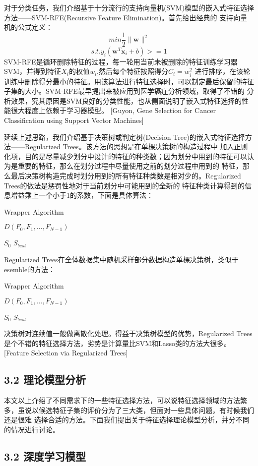 \documentclass[a4paper,UTF8]{article}
\begin{document}
对于分类任务，我们介绍基于十分流行的支持向量机(SVM)模型的嵌入式特征选择方法——SVM-RFE(Recursive Feature Elimination)。首先给出经典的
支持向量机的公式定义：
$$ min \frac{1}{2}\parallel \textbf{w} \parallel^{2} $$
$$ s.t. y_{i}(\textbf{w}^{T}\textbf{x}_{i}+b)>=1 $$
SVM-RFE是循环删除特征的过程，每一轮用当前未被删除的特征训练学习器SVM，并得到特征$X_{i}$的权值$w_{i}$,然后每个特征按照得分$C_{i}=w_{i}^{2}$
进行排序，在该轮训练中删除得分最小的特征。用该算法进行特征选择时，可以制定最后保留的特征子集的大小。SVM-RFE最早提出来被应用到医学癌症分析领域，取得了不错的
分析效果，究其原因是SVM良好的分类性能，也从侧面说明了嵌入式特征选择的性能很大程度上依赖于学习器模型。
[Guyon, Gene Selection for Cancer Classification using Support Vector Machines]


延续上述思路，我们介绍基于决策树或判定树(Decision Tree)的嵌入式特征选择方法——Regularized Trees。该方法的思想是在单棵决策树的构造过程中
加入正则化项，目的是尽量减少划分中设计的特征的种类数；因为划分中用到的特征可以认为是重要的特征，那么在划分过程中尽量使用之前的划分过程中用到的
特征，那么最后决策树构造完成时划分用到的所有特征种类数是相对少的。Regularized Trees的做法是惩罚性地对于当前划分中可能用到的全新的
特征种类计算得到的信息增益乘上一个小于1的系数，下面是具体算法：

\begin{algorithm}
  \caption{Wrapper Algorithm}
  \begin{algorithmic}
    \REQUIRE $ D(F_{0}, F_{1},..., F_{N-1})$

             $ S_{0}$
    \ENSURE $ S_{best} $

  \end{algorithmic}




\end{algorithm}
Regularized Trees在全体数据集中随机采样部分数据构造单棵决策树，类似于esemble的方法：
\begin{algorithm}
  \caption{Wrapper Algorithm}
  \begin{algorithmic}
    \REQUIRE $ D(F_{0}, F_{1},..., F_{N-1})$

             $ S_{0}$
    \ENSURE $ S_{best} $

  \end{algorithmic}




\end{algorithm}

决策树对连续值一般做离散化处理。得益于决策树模型的优势，Regularized Trees是个不错的特征选择方法，劣势是计算量比SVM和Lasso类的方法大很多。
[Feature Selection via Regularized Trees]



\subsection*{3.2 理论模型分析}

本文以上介绍了不同需求下的一些特征选择方法，可以说特征选择领域的方法繁多，虽说以候选特征子集的评价分为了三大类，但面对一些具体问题，有时候我们还是很难
选择合适的方法。下面我们提出关于特征选择理论模型分析，并分不同的情况进行讨论。


\subsection*{3.2 深度学习模型}
\end{document}
